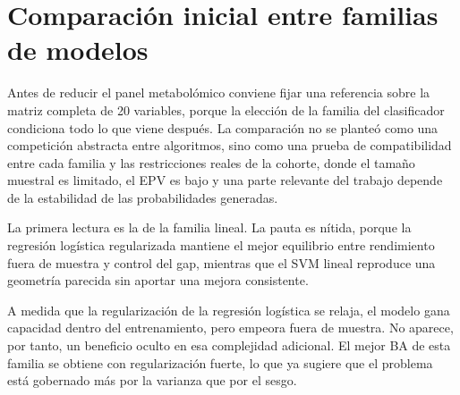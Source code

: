 \section{Comparación inicial entre familias de modelos}\label{sec:familias_modelo}

Antes de reducir el panel metabolómico conviene fijar una referencia sobre la matriz completa de 20 variables, porque la
elección de la familia del clasificador condiciona todo lo que viene después. La comparación no se planteó como una
competición abstracta entre algoritmos, sino como una prueba de compatibilidad entre cada familia y las restricciones
reales de la cohorte, donde el tamaño muestral es limitado, el EPV es bajo y una parte relevante del trabajo depende de
la estabilidad de las probabilidades generadas.

La primera lectura es la de la familia lineal. La pauta es nítida, porque la regresión logística regularizada mantiene
el mejor equilibrio entre rendimiento fuera de muestra y control del gap, mientras que el SVM lineal reproduce una
geometría parecida sin aportar una mejora consistente.

\begin{table}[ht]
\centering
\caption{Comparación de configuraciones lineales sobre la matriz completa de 20 variables, evaluadas con 200 particiones estratificadas 80/20.}
\label{tab:modelos_lineales}
\small
\setlength{\tabcolsep}{4pt}
\end{table}

A medida que la regularización de la regresión logística se relaja, el modelo gana capacidad dentro del entrenamiento,
pero empeora fuera de muestra. No aparece, por tanto, un beneficio oculto en esa complejidad adicional. El mejor BA de
esta familia se obtiene con regularización fuerte, lo que ya sugiere que el problema está gobernado más por la varianza
que por el sesgo.

